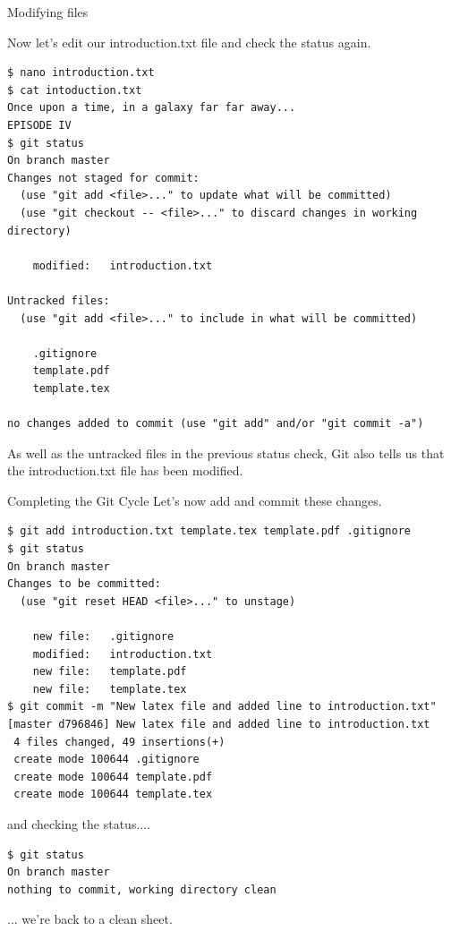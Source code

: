 \documentclass[10pt]{beamer}
\begin{document}
\begin{frame}[fragile]{Modifying files}

Now let's edit our introduction.txt file and check the status again.
\begin{lstlisting}
$ nano introduction.txt
$ cat intoduction.txt
Once upon a time, in a galaxy far far away...
EPISODE IV
$ git status
On branch master
Changes not staged for commit:
  (use "git add <file>..." to update what will be committed)
  (use "git checkout -- <file>..." to discard changes in working directory)

	modified:   introduction.txt

Untracked files:
  (use "git add <file>..." to include in what will be committed)

	.gitignore
	template.pdf
	template.tex

no changes added to commit (use "git add" and/or "git commit -a")
\end{lstlisting}

As well as the untracked files in the previous status check, Git also tells us that the introduction.txt file has been modified.

\end{frame}

\begin{frame}[fragile]{Completing the Git Cycle}
 Let's now add and commit these changes.
\begin{lstlisting}
$ git add introduction.txt template.tex template.pdf .gitignore
$ git status
On branch master
Changes to be committed:
  (use "git reset HEAD <file>..." to unstage)

	new file:   .gitignore
	modified:   introduction.txt
	new file:   template.pdf
	new file:   template.tex
$ git commit -m "New latex file and added line to introduction.txt"
[master d796846] New latex file and added line to introduction.txt
 4 files changed, 49 insertions(+)
 create mode 100644 .gitignore
 create mode 100644 template.pdf
 create mode 100644 template.tex
\end{lstlisting}
and checking the status....
\begin{lstlisting}
$ git status
On branch master
nothing to commit, working directory clean
\end{lstlisting}
... we're back to a clean sheet.


\end{frame}
\end{document}
